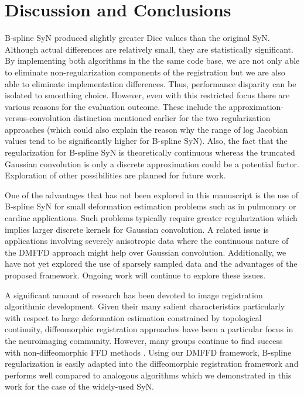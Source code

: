 \documentclass{frontiersSCNS}
\begin{document}
\section{Discussion and Conclusions}


B-spline SyN produced slightly greater Dice values than the original SyN.  Although
actual differences are relatively small, they are statistically significant. By 
implementing both algorithms in the the same code base, we are not only able to 
eliminate non-regularization components of the registration but we are also able
to eliminate implementation differences.  Thus, performance disparity can be isolated
to smoothing choice.  However, even with this restricted focus there are various
reasons for the evaluation outcome.  These include the approximation-versus-convolution 
distinction mentioned earlier for the two regularization approaches (which could
also explain the reason why the range of log Jacobian values tend to be
significantly higher for B-spline SyN).  Also, the fact that the regularization 
for B-spline SyN is theoretically continuous whereas the truncated Gaussian 
convolution is only a discrete approximation could be a potential factor.  Exploration
of other possibilities are planned for future work.

One of the advantages that has not been explored in this manuscript is 
the use of B-spline SyN for small deformation estimation problems such 
as in pulmonary or cardiac applications.  Such problems typically require
greater regularization which implies larger discrete kernels for 
Gaussian convolution.
A related issue is applications involving severely anisotropic data where
the continuous nature of the DMFFD approach might help over Gaussian convolution.
Additionally, we have not yet explored the use of sparsely sampled data 
and the advantages of the proposed framework.
Ongoing work will continue to explore these issues.

A significant amount of research has been devoted to image registration
algorithmic development.  Given their many salient characteristics particularly with
respect to large deformation estimation constrained by topological 
continuity, diffeomorphic registration
approaches have been a particular focus in the neuroimaging community.
However, many groups continue to find success with non-diffeomorphic
FFD methods
\citep[e.g.][]{rueckert1999,klein2010}.  Using our DMFFD framework, 
B-spline regularization is easily adapted into the diffeomorphic registration 
framework and performs well compared to analogous algorithms which we demonstrated 
in this work for the case of the widely-used SyN.
\end{document}
